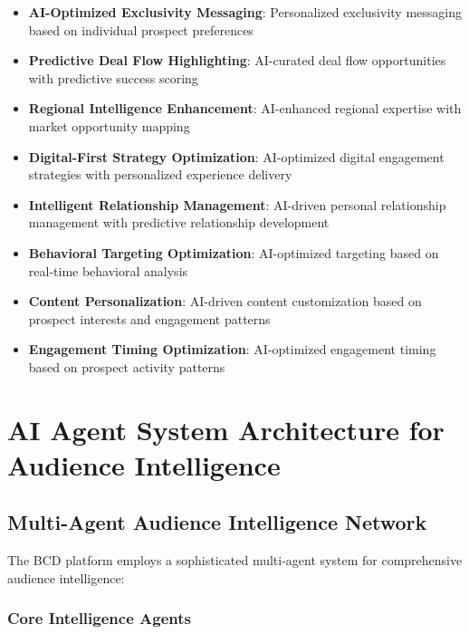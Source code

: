 \begin{itemize}
    \item \textbf{AI-Optimized Exclusivity Messaging}: Personalized exclusivity messaging based on individual prospect preferences
    \item \textbf{Predictive Deal Flow Highlighting}: AI-curated deal flow opportunities with predictive success scoring
    \item \textbf{Regional Intelligence Enhancement}: AI-enhanced regional expertise with market opportunity mapping
    \item \textbf{Digital-First Strategy Optimization}: AI-optimized digital engagement strategies with personalized experience delivery
    \item \textbf{Intelligent Relationship Management}: AI-driven personal relationship management with predictive relationship development
    \item \textbf{Behavioral Targeting Optimization}: AI-optimized targeting based on real-time behavioral analysis
    \item \textbf{Content Personalization}: AI-driven content customization based on prospect interests and engagement patterns
    \item \textbf{Engagement Timing Optimization}: AI-optimized engagement timing based on prospect activity patterns
\end{itemize}

\section{AI Agent System Architecture for Audience Intelligence}

\subsection{Multi-Agent Audience Intelligence Network}

The BCD platform employs a sophisticated multi-agent system for comprehensive audience intelligence:

\subsubsection{Core Intelligence Agents}

